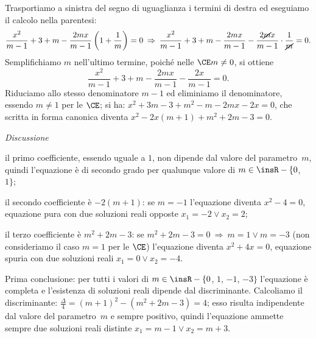 \begin{exrig}
\begin{esempio}
Trasportiamo a sinistra del segno di uguaglianza i termini di destra ed eseguiamo il calcolo nella parentesi: 
\[\frac{x^{2}}{m - 1} + 3 + m - \frac{2 m x}{m - 1} \left( 1 +\frac{1}{m} \right) = 0 \:\Rightarrow\: \frac{x^{2}}{m - 1} + 3 + m - \frac{2 m x}{m - 1} - \frac{2 \cancel{m} x}{m - 1} \cdot \frac{1}{\cancel{m}} = 0.\]
Semplifichiamo $m$ nell'ultimo termine, poiché nelle $\CE m \neq 0$, si ottiene
\[\frac{x^{2}}{m - 1} + 3 + m - \frac{2 mx}{m - 1} - \frac{2 x}{m - 1}=0.\]
Riduciamo allo stesso denominatore $m - 1$ ed eliminiamo il denominatore, essendo $m \neq 1$ per le $\CE$; si ha: $x^{2} + 3 m - 3 + m^{2} - m - 2 m x - 2 x = 0$, che scritta in forma canonica diventa $x^{2} - 2 x ( m + 1 ) + m^{2} + 2 m - 3 = 0$.

\emph{Discussione}
\begin{itemize*}
\item il primo coefficiente, essendo uguale a $1$, non dipende dal valore del parametro~$m$, quindi l'equazione è di secondo grado per qualunque valore di $m \in \insR - \{0$, $1\}$;
\item il secondo coefficiente è $- 2 (m + 1)$: se $m = - 1$ l'equazione diventa $x^{2} - 4 = 0$, equazione pura con due soluzioni reali opposte $x_{1} = - 2 \vee x_{2} = 2$;
\item il terzo coefficiente è $m^{2} + 2 m - 3$: se $m^{2} + 2 m - 3 = 0 \:\Rightarrow\: m = 1 \vee m = - 3$ (non consideriamo il caso $m = 1$ per le $\CE$) l'equazione diventa $x^{2} + 4 x = 0$, equazione spuria con due soluzioni reali $x_{1} = 0 \vee x_{2} = - 4$.
\end{itemize*}
Prima conclusione: per tutti i valori di $m \in \insR -\{0$, $1$, $-1$, $-3\}$ l'equazione è completa e l'esistenza di soluzioni reali dipende dal discriminante. Calcoliamo il discriminante: $\frac{\Delta}{4} = ( m + 1 )^{2} - ( m^{2} + 2 m - 3 ) = 4$; esso risulta indipendente dal valore del parametro~$m$ e sempre positivo, quindi l'equazione ammette sempre due soluzioni reali distinte $x_{1} = m - 1 \vee x_{2} = m + 3$.


\end{esempio}
\end{exrig}
